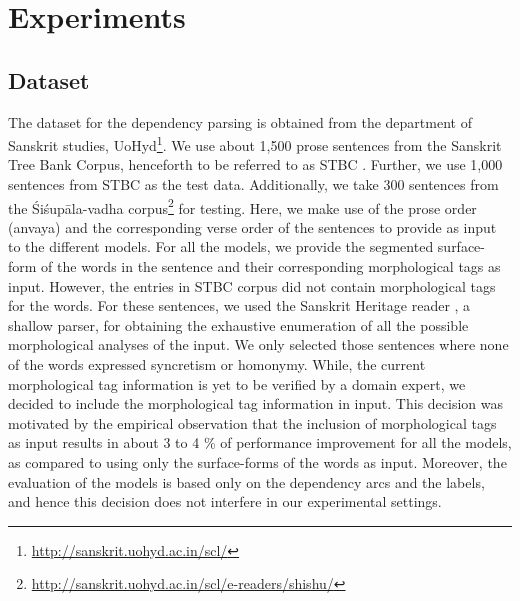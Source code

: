 \documentclass[11pt]{article}
\begin{document}

\section{Experiments}
\subsection{Dataset}
The dataset for the dependency parsing is obtained from the department of Sanskrit studies, UoHyd\footnote{\url{http://sanskrit.uohyd.ac.in/scl/}}. We use about 1,500 prose sentences from the Sanskrit Tree Bank Corpus, henceforth to be referred to as STBC \cite{kulkarni10dep,kulkarni-2013-deterministic}. Further, we use 1,000 sentences from STBC as the test data. Additionally, we take 300 sentences from the Śiśupāla-vadha corpus\footnote{\url{http://sanskrit.uohyd.ac.in/scl/e-readers/shishu/}} for testing. Here, we make use of the prose order (anvaya) and the corresponding verse order of the sentences to provide as input to the different models. For all the models, we provide the segmented surface-form of the words in the sentence and their corresponding morphological tags as input. However, the entries in STBC corpus did not contain morphological tags for the words. For these sentences, we used the Sanskrit Heritage reader \cite{goyal2016design,huet-goyal13}, a shallow parser, for obtaining the exhaustive enumeration of all the possible morphological analyses of the input. We only selected those sentences where none of the words expressed syncretism or homonymy. While, the current morphological tag information is yet to be verified by a domain expert, we decided to include the morphological tag information in  input. This decision was motivated by the empirical observation that the inclusion of morphological tags as input results in about 3 to 4 \% of performance improvement for all the models, as compared to using only the surface-forms of the words as input. Moreover, the evaluation of the models is based only on the dependency arcs and the labels, and hence this decision does not interfere in our experimental settings.
\end{document}
